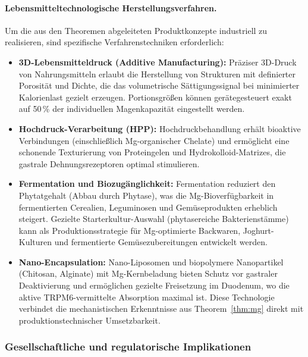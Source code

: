 ﻿\documentclass[12pt,a4paper]{article}
\theoremstyle{plain}
\theoremstyle{definition}
\theoremstyle{remark}
\begin{document}
\paragraph{Lebensmitteltechnologische Herstellungsverfahren.}
Um die aus den Theoremen abgeleiteten Produktkonzepte industriell zu
realisieren, sind spezifische Verfahrenstechniken erforderlich:
\begin{itemize}
  \item \textbf{3D-Lebensmitteldruck (Additive Manufacturing):}
        Präziser 3D-Druck von Nahrungsmitteln erlaubt die Herstellung
        von Strukturen mit definierter Porosität und Dichte, die
        das volumetrische Sättigungssignal bei minimierter Kalorienlast
        gezielt erzeugen. Portionsgrößen können gerätegesteuert exakt
        auf 50\,\% der individuellen Magenkapazität eingestellt werden.
  \item \textbf{Hochdruck-Verarbeitung (HPP):}
        Hochdruckbehandlung erhält bioaktive Verbindungen (einschließlich
        Mg-organischer Chelate) und ermöglicht eine schonende Texturierung
        von Proteingelen und Hydrokolloid-Matrizes, die gastrale
        Dehnungsrezeptoren optimal stimulieren.
  \item \textbf{Fermentation und Biozugänglichkeit:}
        Fermentation reduziert den Phytatgehalt (Abbau durch Phytase),
        was die Mg-Bioverfügbarkeit in fermentierten Cerealien, Leguminosen
        und Gemüseprodukten erheblich steigert. Gezielte Starterkultur-Auswahl
        (phytasereiche Bakterienstämme) kann als Produktionsstrategie für
        Mg-optimierte Backwaren, Joghurt-Kulturen und fermentierte
        Gemüsezubereitungen entwickelt werden.
  \item \textbf{Nano-Encapsulation:}
        Nano-Liposomen und biopolymere Nanopartikel (Chitosan, Alginate)
        mit Mg-Kernbeladung bieten Schutz vor gastraler Deaktivierung und
        ermöglichen gezielte Freisetzung im Duodenum, wo die aktive
        TRPM6-vermittelte Absorption maximal ist. Diese Technologie
        verbindet die mechanistischen Erkenntnisse aus Theorem~\ref{thm:mg}
        direkt mit produktionstechnischer Umsetzbarkeit.
\end{itemize}

\subsubsection{Gesellschaftliche und regulatorische Implikationen}
\end{document}
